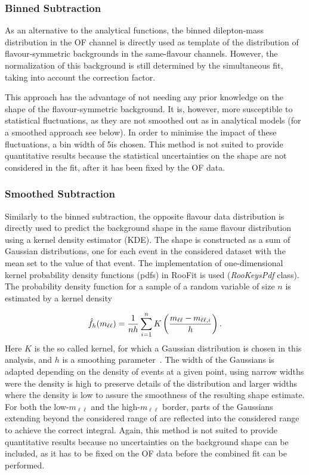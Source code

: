 \subsubsection{Binned Subtraction}
\label{shapesubtraction:binnedsubtraction}
As an alternative to the analytical functions, the binned dilepton-mass distribution in the OF channel is directly used as  template of the distribution of flavour-symmetric backgrounds in the same-flavour channels. However, the normalization of this background is still determined by the simultaneous fit, taking into account the \Rsfof correction factor.

This approach has the advantage of not needing any prior knowledge on the shape of the flavour-symmetric background. It is, however, more susceptible to statistical fluctuations, as they are not smoothed out as in analytical models (for a smoothed approach see below). In order to minimise the impact of these fluctuations, a bin width of 5\GeV is chosen. This method is not suited to provide quantitative results because the statistical uncertainties on the shape are not considered in the fit, after it has been fixed by the OF data.
\subsubsection{Smoothed Subtraction}
Similarly to the binned subtraction, the opposite flavour data distribution is directly used to predict the background shape in the same flavour distribution using a kernel density estimator (KDE). The shape is constructed as a sum of Gaussian distributions, one for each event in the considered dataset with the mean set to the \mll value of that event. The implementation of one-dimensional kernel probability density functions (pdfs) in RooFit is used (\emph{RooKeysPdf} class). The probability density function for a sample of a random variable of size $n$ is estimated by a kernel density

\begin{equation*}
\hat{f}_h(m_{\ell\ell}) = \frac{1}{nh}\sum\limits_{i=1}^n K\left(\frac{m_{\ell\ell}-m_{\ell\ell,i}}{h}\right).
\end{equation*}
Here $K$ is the so called kernel, for which a Gaussian distribution is chosen in this analysis, and $h$ is a smoothing parameter~\cite{kernelDensity}. The width of the Gaussians is adapted depending on the density of events at a given point, using narrow widths were the density is high to preserve details of the distribution and larger widths where the density is low to assure the smoothness of the resulting shape estimate. For both the low-$m_{\ell\ell}$ and the high-$m_{\ell\ell}$ border, parts of the Gaussians extending beyond the considered range of \mll are reflected into the considered range to achieve the correct integral. Again, this method is not suited to provide quantitative results because no uncertainties on the background shape can be included, as it has to be fixed on the OF data before the combined fit can be performed.

